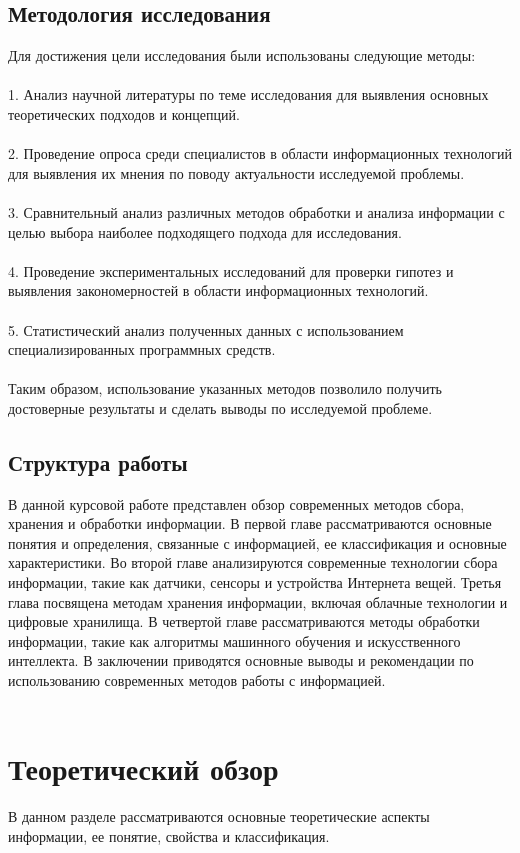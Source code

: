 \documentclass{article}
\begin{document}
\subsection{Методология исследования}
Для достижения цели исследования были использованы следующие методы:\\
~\\
1. Анализ научной литературы по теме исследования для выявления основных теоретических подходов и концепций.\\
~\\
2. Проведение опроса среди специалистов в области информационных технологий для выявления их мнения по поводу актуальности исследуемой проблемы.\\
~\\
3. Сравнительный анализ различных методов обработки и анализа информации с целью выбора наиболее подходящего подхода для исследования.\\
~\\
4. Проведение экспериментальных исследований для проверки гипотез и выявления закономерностей в области информационных технологий.\\
~\\
5. Статистический анализ полученных данных с использованием специализированных программных средств.\\
~\\
Таким образом, использование указанных методов позволило получить достоверные результаты и сделать выводы по исследуемой проблеме.
\subsection{Структура работы}
В данной курсовой работе представлен обзор современных методов сбора, хранения и обработки информации. В первой главе рассматриваются основные понятия и определения, связанные с информацией, ее классификация и основные характеристики. Во второй главе анализируются современные технологии сбора информации, такие как датчики, сенсоры и устройства Интернета вещей. Третья глава посвящена методам хранения информации, включая облачные технологии и цифровые хранилища. В четвертой главе рассматриваются методы обработки информации, такие как алгоритмы машинного обучения и искусственного интеллекта. В заключении приводятся основные выводы и рекомендации по использованию современных методов работы с информацией.\\
~\\

\newpage
\section{Теоретический обзор}
В данном разделе рассматриваются основные теоретические аспекты информации, ее понятие, свойства и классификация.
\end{document}
